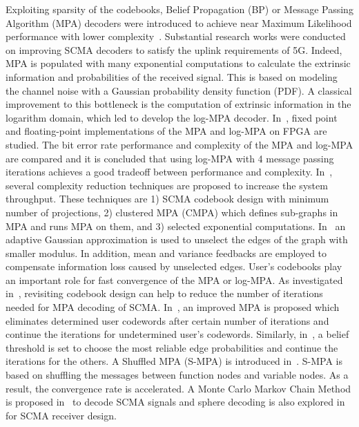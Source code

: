Exploiting sparsity of the codebooks, Belief Propagation (BP) or Message Passing
Algorithm (MPA) decoders were introduced to achieve near Maximum Likelihood
performance with lower complexity~\cite{Zhang2014a}. Substantial research works
were conducted on improving SCMA decoders to satisfy the uplink requirements of
5G. Indeed, MPA is populated with many exponential computations to calculate the
extrinsic information and probabilities of the received signal. This is based on
modeling the channel noise with a Gaussian probability density function (PDF). A
classical improvement to this bottleneck is the computation of extrinsic
information in the logarithm domain, which led to develop the log-MPA decoder.
In~\cite{Liu2016}, fixed point and floating-point implementations of the MPA and
log-MPA on FPGA are studied. The bit error rate performance and complexity of
the MPA and log-MPA are compared and it is concluded that using log-MPA with 4
message passing iterations achieves a good tradeoff between performance and
complexity. In~\cite{Bayesteh2015}, several complexity reduction techniques are
proposed to increase the system throughput. These techniques are 1) SCMA
codebook design with minimum number of projections, 2) clustered MPA (CMPA)
which defines sub-graphs in MPA and runs MPA on them, and 3) selected
exponential computations. In~\cite{Du2016} an adaptive Gaussian approximation
is used to unselect the edges of the graph with smaller modulus. In addition,
mean and variance feedbacks are employed to compensate information loss caused
by unselected edges. User's codebooks play an important role for fast
convergence of the MPA or log-MPA. As investigated in~\cite{Taherzadeh2014,
Peng2017,Yan2017}, revisiting codebook design can help to reduce the number of
iterations needed for MPA decoding of SCMA. In~\cite{Jia2018}, an improved MPA
is proposed which eliminates determined user codewords after certain number of
iterations and continue the iterations for undetermined user's codewords.
Similarly, in~\cite{Yang2016}, a belief threshold is set to choose the most
reliable edge probabilities and continue the iterations for the others. A
Shuffled MPA (S-MPA) is introduced in~\cite{Du2016a}. S-MPA is based on
shuffling the messages between function nodes and variable nodes. As a result,
the convergence rate is accelerated. A Monte Carlo Markov Chain Method is
proposed in~\cite{Chen2016} to decode SCMA signals and sphere decoding is also
explored in~\cite{Yang2017,Wei2017} for SCMA receiver design.

